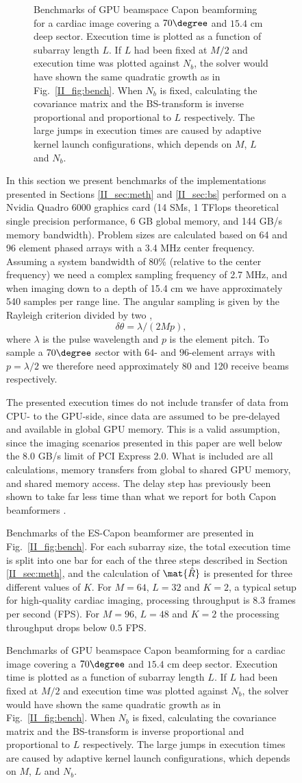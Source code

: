 \begin{figure}[!t]
\begin{figure}[!t]
{{  \label{II_fig:benchBS96}}}
\fi%
\caption{Benchmarks of GPU beamspace Capon beamforming for a cardiac image covering a $70 \degree$ and $15.4$ cm deep sector. Execution time is plotted as a function of subarray length $L$.  If $L$ had been fixed at $M/2$ and execution time was plotted against $N_b$, the solver would have shown the same quadratic growth as in Fig.\ \ref{II_fig:bench}. When $N_b$ is fixed, calculating the covariance matrix and the BS-transform is inverse proportional and proportional to $L$ respectively. The large jumps in execution times are caused by adaptive kernel launch configurations, which depends on $M$, $L$ and $N_b$.}
\label{II_fig:benchBS}
\end{figure}
%
In this section we present benchmarks of the implementations presented in Sections \ref{II_sec:meth} and \ref{II_sec:bs} performed on a Nvidia Quadro 6000 graphics card (14 SMs, 1 TFlops theoretical single precision performance, 6 GB global memory, and 144 GB/s memory bandwidth). Problem sizes are calculated based on 64 and 96 element phased arrays with a 3.4 MHz center frequency. Assuming a system bandwidth of 80\% (relative to the center frequency) we need a complex sampling frequency of 2.7 MHz, and when imaging down to a depth of 15.4 cm we have approximately 540 samples per range line. The angular sampling is given by the Rayleigh criterion divided by two \cite{Hergum2007}, 
%
\begin{equation}\label{II_eq:rayleigh}
\delta{}\theta = \lambda/(2Mp),
\end{equation}
%
where $\lambda$ is the pulse wavelength and $p$ is the element pitch. 
To sample a $70\degree$ sector with $64$- and $96$-element arrays with $p=\lambda/2$ we therefore need approximately 80 and 120 receive beams respectively. 

The presented execution times do not include transfer of data from CPU- to the GPU-side, since data are assumed to be pre-delayed and available in global GPU memory. This is a valid assumption, since the imaging scenarios presented in this paper are well below the 8.0 GB/s limit of PCI Express 2.0. What is included are all calculations, memory transfers from global to shared GPU memory, and shared memory access. The delay step has previously been shown to take far less time than what we report for both Capon beamformers \cite{Song2012, Chen2011}.

Benchmarks of the ES-Capon beamformer are presented in Fig.\ \ref{II_fig:bench}. For each subarray size, the total execution time is split into one bar for each of the three steps described in Section \ref{II_sec:meth}, and the calculation of $\mat{\hat{R}}$ is presented for three different values of $K$. For $M=64$, $L=32$ and $K=2$, a typical setup for high-quality cardiac imaging, processing throughput is 8.3 frames per second (FPS). For $M=96$, $L=48$ and $K=2$ the processing throughput drops below $0.5$ FPS.


\end{figure}
